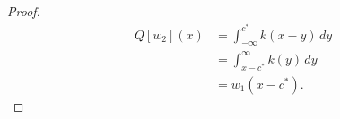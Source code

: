 \documentclass[11pt]{article}
\theoremstyle{definition}
\numberwithin{equation}{section}
\numberwithin{thm}{section}
\renewcommand{\a}{\alpha}
\renewcommand{\b}{\beta}
\newcommand{\m}{\mu}
\begin{document}
\begin{proof}
%

\begin{equation} \begin{aligned}
Q[w_2](x) %
&= \int_{-\infty}^{c^*} k(x-y) \, dy \\
&= \int_{x-c^*}^{\infty} k(y) \, dy \\
&= w_1(x-c^*).
\end{aligned} \end{equation}
\end{proof}
\end{document}
